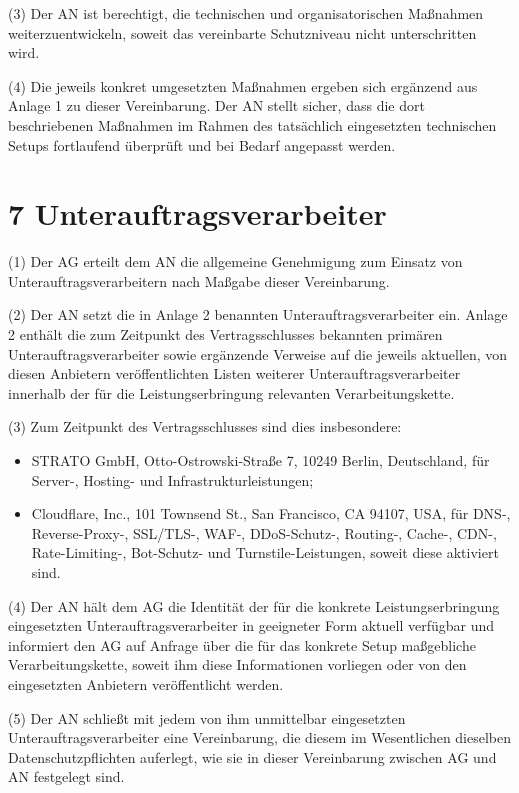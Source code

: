 \documentclass[11pt,a4paper]{article}
\begin{document}
(3) Der AN ist berechtigt, die technischen und organisatorischen Maßnahmen weiterzuentwickeln, soweit das vereinbarte Schutzniveau nicht unterschritten wird.

(4) Die jeweils konkret umgesetzten Maßnahmen ergeben sich ergänzend aus Anlage 1 zu dieser Vereinbarung. Der AN stellt sicher, dass die dort beschriebenen Maßnahmen im Rahmen des tatsächlich eingesetzten technischen Setups fortlaufend überprüft und bei Bedarf angepasst werden.

\section*{7 Unterauftragsverarbeiter}
(1) Der AG erteilt dem AN die allgemeine Genehmigung zum Einsatz von Unterauftragsverarbeitern nach Maßgabe dieser Vereinbarung.

(2) Der AN setzt die in Anlage 2 benannten Unterauftragsverarbeiter ein. Anlage 2 enthält die zum Zeitpunkt des Vertragsschlusses bekannten primären Unterauftragsverarbeiter sowie ergänzende Verweise auf die jeweils aktuellen, von diesen Anbietern veröffentlichten Listen weiterer Unterauftragsverarbeiter innerhalb der für die Leistungserbringung relevanten Verarbeitungskette.

(3) Zum Zeitpunkt des Vertragsschlusses sind dies insbesondere:
\begin{itemize}
  \item STRATO GmbH, Otto-Ostrowski-Straße 7, 10249 Berlin, Deutschland, für Server-, Hosting- und Infrastrukturleistungen;
  \item Cloudflare, Inc., 101 Townsend St., San Francisco, CA 94107, USA, für DNS-, Reverse-Proxy-, SSL/TLS-, WAF-, DDoS-Schutz-, Routing-, Cache-, CDN-, Rate-Limiting-, Bot-Schutz- und Turnstile-Leistungen, soweit diese aktiviert sind.
\end{itemize}

(4) Der AN hält dem AG die Identität der für die konkrete Leistungserbringung eingesetzten Unterauftragsverarbeiter in geeigneter Form aktuell verfügbar und informiert den AG auf Anfrage über die für das konkrete Setup maßgebliche Verarbeitungskette, soweit ihm diese Informationen vorliegen oder von den eingesetzten Anbietern veröffentlicht werden.

(5) Der AN schließt mit jedem von ihm unmittelbar eingesetzten Unterauftragsverarbeiter eine Vereinbarung, die diesem im Wesentlichen dieselben Datenschutzpflichten auferlegt, wie sie in dieser Vereinbarung zwischen AG und AN festgelegt sind.
\end{document}
